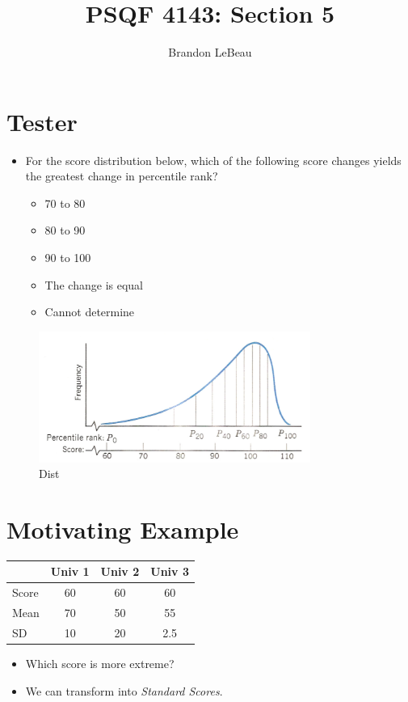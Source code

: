 \documentclass[12pt]{article}
\title{PSQF 4143: Section 5}
\author{Brandon LeBeau}
\date{}
\begin{document}
\maketitle

\section{Tester}\label{tester}

\begin{itemize}
\itemsep1pt\parskip0pt
\item
  For the score distribution below, which of the following score changes
  yields the greatest change in percentile rank?

  \begin{itemize}
  \itemsep1pt\parskip0pt
  \item
    70 to 80
  \item
    80 to 90
  \item
    90 to 100
  \item
    The change is equal
  \item
    Cannot determine
  \end{itemize}
\end{itemize}

\begin{figure}[H]
\centering
\includegraphics[width=3.5in]{pr_ques.png}
\caption{Dist}
\end{figure}

\section{Motivating Example}\label{motivating-example}

\begin{longtable}[c]{@{}lccc@{}}
\toprule
& Univ 1 & Univ 2 & Univ 3\tabularnewline
\midrule
\endhead
Score & 60 & 60 & 60\tabularnewline
Mean & 70 & 50 & 55\tabularnewline
SD & 10 & 20 & 2.5\tabularnewline
\bottomrule
\end{longtable}

\begin{itemize}
\itemsep1pt\parskip0pt
\item
  Which score is more extreme?
\item
  We can transform into \emph{Standard Scores}.
\end{itemize}
\end{document}
